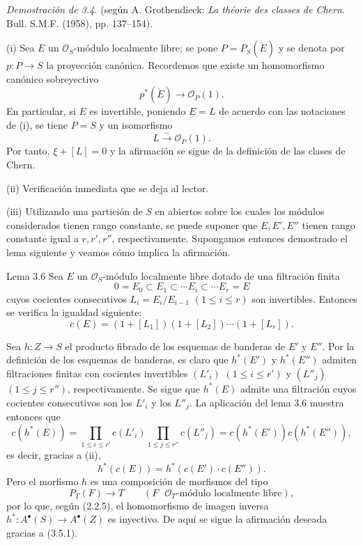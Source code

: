 \emph{Demostración de 3.4.} (según A. Grothendieck: \emph{La théorie des classes de Chern}. Bull. S.M.F. (1958), pp. 137--154).

(i) Sea $E$ un $\mathcal O_S$-módulo localmente libre; se pone $P=P_S(\check E)$ y se denota por $p:P\to S$ la proyección canónica. Recordemos que existe un homomorfismo canónico sobreyectivo
\[
p^*(\check E)\longrightarrow \mathcal O_P(1).
\]
En particular, si $E$ es invertible, poniendo $E=L$ de acuerdo con las notaciones de (i), se tiene $P=S$ y un isomorfismo
\[
L\xrightarrow{\sim}\mathcal O_P(1).
\]
Por tanto, $\xi+[L]=0$ y la afirmación se sigue de la definición de las clases de Chern.

(ii) Verificación inmediata que se deja al lector.

(iii) Utilizando una partición de $S$ en abiertos sobre los cuales los módulos considerados tienen rango constante, se puede suponer que $E,E',E''$ tienen rango constante igual a $r,r',r''$, respectivamente. Supongamos entonces demostrado el lema siguiente y veamos cómo implica la afirmación.

\begin{statement}{Lema 3.6}
Sea $E$ un $\mathcal O_S$-módulo localmente libre dotado de una filtración finita
\[
0=E_0\subset E_1\subset\cdots E_i\subset\cdots E_r=E
\]
cuyos cocientes consecutivos $L_i=E_i/E_{i-1}$ $(1\le i\le r)$ son invertibles. Entonces se verifica la igualdad siguiente:
\[
c(E)=(1+[L_1])(1+[L_2])\cdots(1+[L_r]).
\]
\end{statement}

Sea $h:Z\to S$ el producto fibrado de los esquemas de banderas de $E'$ y $E''$. Por la definición de los esquemas de banderas, es claro que $h^*(E')$ y $h^*(E'')$ admiten filtraciones finitas con cocientes invertibles $(L'_i)$ $(1\le i\le r')$ y $(L''_j)$ $(1\le j\le r'')$, respectivamente. Se sigue que $h^*(E)$ admite una filtración cuyos cocientes consecutivos son los $L'_i$ y los $L''_j$. La aplicación del lema 3.6 muestra entonces que
\[
c(h^*(E))=
\prod_{1\le i\le r'}c(L'_i)\prod_{1\le j\le r''}c(L''_j)
=c(h^*(E'))c(h^*(E'')),
\]
es decir, gracias a (ii),
\[
h^*(c(E))=h^*(c(E')\cdot c(E'')).
\tag{3.5.1}
\]
Pero el morfismo $h$ es una composición de morfismos del tipo
\[
P_T(F)\longrightarrow T
\qquad (F\text{ }\mathcal O_T\text{-módulo localmente libre}),
\]
por lo que, según (2.2.5), el homomorfismo de imagen inversa $h^*:A^{\bullet}(S)\to A^{\bullet}(Z)$ es inyectivo. De aquí se sigue la afirmación deseada gracias a (3.5.1).
